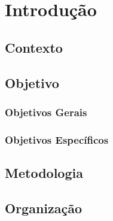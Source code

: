 \chapter[Introdução]{Introdução}

\section{Contexto}
\section{Objetivo}
\subsection{Objetivos Gerais}
\subsection{Objetivos Específicos}
\section{Metodologia}
\section{Organização}
